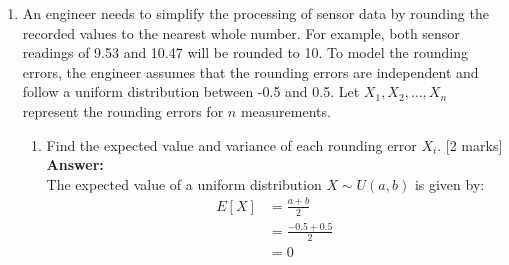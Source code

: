 \documentclass[12pt]{article}
\begin{document}
\begin{enumerate}
\begin{enumerate}
\begin{align*}
  \Pm(Z=z) &= \begin{cases}
    1 & \text{if } 0 \leq z \leq 1 \\
    0 & \text{otherwise}
\end{cases}
\end{align*}

%


\item{\bf (*STAT7003)} 
Suppose the test is repeated independently $N$ times. Let $N_A$ be the number of times machine A completes the task before machine B. What is the distribution of $N_A$? What is the probability that machine A is faster than machine B in more than half of the $N$ trials?
			\\\phantom{1}\hfill [10 marks]
%
\\
\textbf{Answer:}
\\
We are looking for $\Pm(A < B)$, which is the probability that machine A is faster than machine B in a single trial.

\begin{align*}
\Pm(A < B) &= \sum_{a=1}^{\infty} \Pm(A = a) \cdot \Pm(B > a) \\
&= \sum_{a=1}^{\infty} (1-p)^{a-1}p \cdot \sum_{b=a+1}^{\infty} (1-p)^{b-1}p \\
&= \sum_{a=1}^{\infty} (1-p)^{a-1}p (1-p)^a \\
&= \frac{1-p}{2-p}
\end{align*}

Therefore, the distribution of $N_A$ is given by a binomial distribution with parameters $N$ and $\Pm(A < B) = \frac{1-p}{2-p}$ or $N_A \sim \Bin(N, \frac{1-p}{2-p})$.

\end{enumerate}

\vspace{5pt}
\item An engineer needs to simplify the processing of sensor data by rounding the recorded values to the nearest whole number. For example, both sensor readings of 9.53 and 10.47 will be rounded to 10. To model the rounding errors, the engineer assumes that the rounding errors are independent and follow a uniform distribution between -0.5 and 0.5. Let $X_1, X_2, \ldots, X_n$ represent the rounding errors for $n$ measurements.  

\begin{enumerate}
\item Find the expected value and variance of each rounding error $X_i$.
			\hfill [2 marks]
%
\\
\textbf{Answer:}
\\
The expected value of a uniform distribution $X \sim U(a, b)$ is given by:
\begin{align*}
E[X] &= \frac{a + b}{2} \\
&= \frac{-0.5 + 0.5}{2} \\
&= 0 \\
\end{align*}


\end{enumerate}
\end{enumerate}
\end{document}
